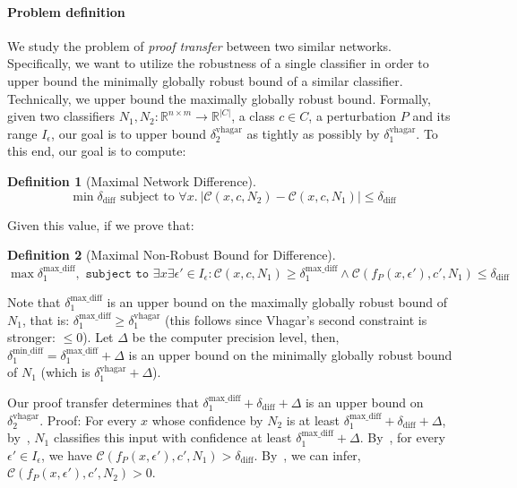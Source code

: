 \documentclass[11pt]{article}
\newtheorem{definition}{Definition}
\begin{document}
\paragraph{Problem definition} 
We study the problem of \emph{proof transfer} between two similar networks. 
Specifically, we want to utilize the robustness of a single classifier in order to upper bound the minimally globally robust bound of a similar classifier. 
Technically, we upper bound the maximally globally robust bound.
Formally, given two classifiers $N_1,N_2: \mathbb{R}^{n \times m} \rightarrow {\mathbb{R}}^{|C|}$, a class $c\in{C}$, a perturbation $P$ and its range $I_\epsilon$, our goal is to upper bound $\delta_2^\text{vhagar}$ as tightly as possibly by $\delta_1^\text{vhagar}$. To this end, our goal is to compute:
\begin{definition}[Maximal Network Difference]
\begin{equation}\label{eq:diff}
\min \delta_\text{diff}\text{ subject to } \forall x.\ |\mathcal{C}(x,c,N_2)-\mathcal{C}(x,c,N_1)|\leq \delta_\text{diff}
\end{equation}
\end{definition}
Given this value, if we prove that: 
\begin{definition}[Maximal Non-Robust Bound for Difference]
\begin{equation}\label{eq:vagdiff}
\max{\delta^\text{max\_diff}_1}, \texttt{ subject to } \exists{x}\exists{\epsilon'}\in{I_\epsilon}: \mathcal{C}(x,c,N_1) \geq \delta^\text{max\_diff}_1 \land \mathcal{C}(f_P(x,\epsilon'),c',N_1)\leq \delta_\text{diff}
\end{equation}
\end{definition}
Note that $\delta^\text{max\_diff}_1$ is an upper bound on the maximally globally robust bound of $N_1$, that is: $\delta^\text{max\_diff}_1\geq \delta^\text{vhagar}_1$ (this follows since Vhagar's second constraint is stronger: $\leq 0$). 
Let $\Delta$ be the computer precision level, then, $\delta^\text{min\_diff}_1 = \delta^\text{max\_diff}_1+\Delta$ is an upper bound on the minimally globally robust bound of $N_1$ (which is $\delta^\text{vhagar}_1+\Delta$).

Our proof transfer determines that $\delta^\text{max\_diff}_1+\delta_\text{diff}+\Delta$ is an upper bound on $\delta^\text{vhagar}_2$. Proof: For every $x$ whose confidence by $N_2$ is at least  $\delta^\text{max\_diff}_1+\delta_\text{diff}+\Delta$, by~, $N_1$ classifies this input with confidence at least $\delta^\text{max\_diff}_1+\Delta$. By~, for every $\epsilon'\in I_\epsilon$, we have $\mathcal{C}(f_P(x,\epsilon'),c',N_1)>\delta_\text{diff}$. By~, we can infer, $\mathcal{C}(f_P(x,\epsilon'),c',N_2)>0$.
\end{document}

